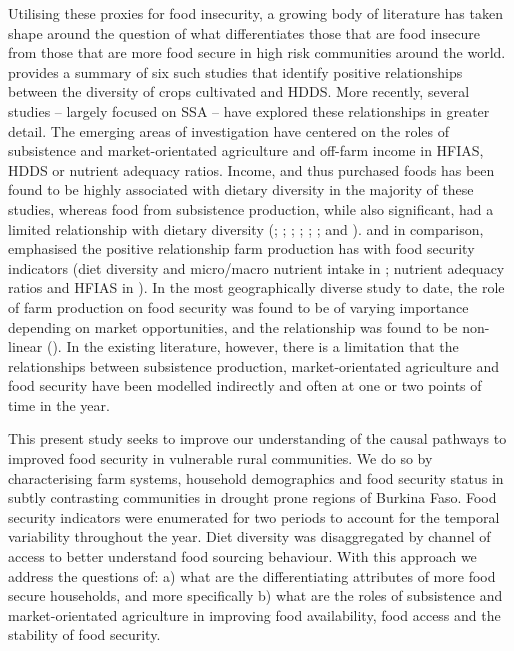 Utilising these proxies for food insecurity, a growing body of literature has taken shape around the question of what differentiates those that are food insecure from those that are more food secure in high risk communities around the world. \citet{Powell2015} provides a summary of six such studies that identify positive relationships between the diversity of crops cultivated and HDDS. More recently, several studies -- largely focused on SSA -- have explored these relationships in greater detail. The emerging areas of investigation have centered on the roles of subsistence and market-orientated agriculture and off-farm income in HFIAS, HDDS or nutrient adequacy ratios. Income, and thus purchased foods has been found to be highly associated with dietary diversity in the majority of these studies, whereas food from subsistence production, while also significant, had a limited relationship with dietary diversity (\citealp{Some2018}; \citealp{Bellon2016}; \citealp{Koppmair2017325}; \citealp{Luckett20152479}; \citealp{Sibhatu201510657}; \citealp{Snapp2015}; and \citealp{Dillon2014}). \citet{Jones2016} and \citet{MKaibi2015} in comparison, emphasised the positive relationship farm production has with food security indicators (diet diversity and micro/macro nutrient intake in \citealp{Jones2016}; nutrient adequacy ratios and HFIAS in \citealp{MKaibi2015}). In the most geographically diverse study to date, the role of farm production on food security was found to be of varying importance depending on market opportunities, and the relationship was found to be non-linear (\citealp{Sibhatu201510657}). In the existing literature, however, there is a limitation that the relationships between subsistence production, market-orientated agriculture and food security have been modelled indirectly and often at one or two points of time in the year.

This present study seeks to improve our understanding of the causal pathways to improved food security in vulnerable rural communities. We do so by characterising farm systems, household demographics and food security status in subtly contrasting communities in drought prone regions of Burkina Faso. Food security indicators were enumerated for two periods to account for the temporal variability throughout the year. Diet diversity was disaggregated by channel of access to better understand food sourcing behaviour. With this approach we address the questions of: a) what are the differentiating attributes of more food secure households, and more specifically b) what are the roles of subsistence and market-orientated agriculture in improving food availability, food access and the stability of food security.

